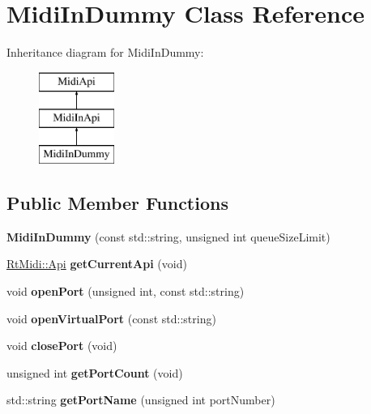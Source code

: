 \hypertarget{class_midi_in_dummy}{}\section{Midi\+In\+Dummy Class Reference}
\label{class_midi_in_dummy}
Inheritance diagram for Midi\+In\+Dummy\+:\begin{figure}[H]
\begin{center}
\leavevmode
\includegraphics[height=3.000000cm]{class_midi_in_dummy}
\end{center}
\end{figure}
\subsection*{Public Member Functions}
\begin{DoxyCompactItemize}
\item 
{\bfseries Midi\+In\+Dummy} (const std\+::string, unsigned int queue\+Size\+Limit)\hypertarget{class_midi_in_dummy_ad5c6d7b0f0c9805a184b33a6864380c1}{}\label{class_midi_in_dummy_ad5c6d7b0f0c9805a184b33a6864380c1}

\item 
\hyperlink{class_rt_midi_aac66af04a85fe5c5f07c360574a19406}{Rt\+Midi\+::\+Api} {\bfseries get\+Current\+Api} (void)\hypertarget{class_midi_in_dummy_a2c444c08749bd94ac0f1bf966ee4c636}{}\label{class_midi_in_dummy_a2c444c08749bd94ac0f1bf966ee4c636}

\item 
void {\bfseries open\+Port} (unsigned int, const std\+::string)\hypertarget{class_midi_in_dummy_ad79b8f5d884393011c4f3d06743ff3db}{}\label{class_midi_in_dummy_ad79b8f5d884393011c4f3d06743ff3db}

\item 
void {\bfseries open\+Virtual\+Port} (const std\+::string)\hypertarget{class_midi_in_dummy_aa2b0bd2ad64107d98e647b5959239038}{}\label{class_midi_in_dummy_aa2b0bd2ad64107d98e647b5959239038}

\item 
void {\bfseries close\+Port} (void)\hypertarget{class_midi_in_dummy_ac92a27020d712f733627e66f9ebce985}{}\label{class_midi_in_dummy_ac92a27020d712f733627e66f9ebce985}

\item 
unsigned int {\bfseries get\+Port\+Count} (void)\hypertarget{class_midi_in_dummy_a58ef17fefed4e003c75859d5cf6fed0e}{}\label{class_midi_in_dummy_a58ef17fefed4e003c75859d5cf6fed0e}

\item 
std\+::string {\bfseries get\+Port\+Name} (unsigned int port\+Number)\hypertarget{class_midi_in_dummy_a83f0f9addff8b50cc5f534fa7809f51d}{}\label{class_midi_in_dummy_a83f0f9addff8b50cc5f534fa7809f51d}

\end{DoxyCompactItemize}
